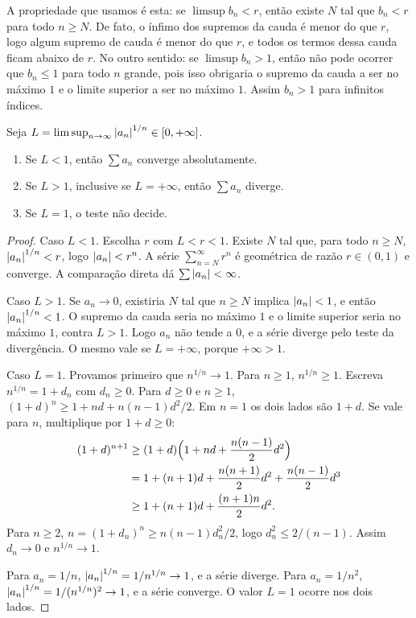 \documentclass[11pt,a4paper]{article}
\begin{document}
A propriedade que usamos é esta: se \(\limsup b_n<r\), então existe \(N\) tal que \(b_n<r\) para todo \(n\ge N\). De fato, o ínfimo dos supremos da cauda é menor do que \(r\), logo algum supremo de cauda é menor do que \(r\), e todos os termos dessa cauda ficam abaixo de \(r\). No outro sentido: se \(\limsup b_n>1\), então não pode ocorrer que \(b_n\le 1\) para todo \(n\) grande, pois isso obrigaria o supremo da cauda a ser no máximo \(1\) e o limite superior a ser no máximo \(1\). Assim \(b_n>1\) para infinitos índices.

\begin{teorema}
Seja \(L=\limsup_{n\to\infty}\left\lvert a_n \right\rvert^{1/n}\in[0,+\infty]\).
\begin{enumerate}
\item Se \(L<1\), então \(\sum a_n\) converge absolutamente.
\item Se \(L>1\), inclusive se \(L=+\infty\), então \(\sum a_n\) diverge.
\item Se \(L=1\), o teste não decide.
\end{enumerate}
\end{teorema}

\begin{proof}
Caso \(L<1\). Escolha \(r\) com \(L<r<1\). Existe \(N\) tal que, para todo \(n\ge N\), \(\left\lvert a_n \right\rvert^{1/n}<r\), logo \(\left\lvert a_n \right\rvert<r^n\). A série \(\sum_{n=N}^\infty r^n\) é geométrica de razão \(r\in(0,1)\) e converge. A comparação direta dá \(\sum\left\lvert a_n \right\rvert<\infty\).

Caso \(L>1\). Se \(a_n\to 0\), existiria \(N\) tal que \(n\ge N\) implica \(\left\lvert a_n \right\rvert<1\), e então \(\left\lvert a_n \right\rvert^{1/n}<1\). O supremo da cauda seria no máximo \(1\) e o limite superior seria no máximo \(1\), contra \(L>1\). Logo \(a_n\) não tende a \(0\), e a série diverge pelo teste da divergência. O mesmo vale se \(L=+\infty\), porque \(+\infty>1\).

Caso \(L=1\). Provamos primeiro que \(n^{1/n}\to 1\). Para \(n\ge 1\), \(n^{1/n}\ge 1\). Escreva \(n^{1/n}=1+d_n\) com \(d_n\ge 0\). Para \(d\ge 0\) e \(n\ge 1\), \((1+d)^n\ge 1+nd+n(n-1)d^2/2\). Em \(n=1\) os dois lados são \(1+d\). Se vale para \(n\), multiplique por \(1+d\ge 0\):
\begin{align*}
(1+d)^{n+1}
&\ge(1+d)\Bigl(1+nd+\frac{n(n-1)}{2}d^2\Bigr)\\
&=1+(n+1)d+\frac{n(n+1)}{2}d^2+\frac{n(n-1)}{2}d^3\\
&\ge 1+(n+1)d+\frac{(n+1)n}{2}d^2.
\end{align*}
Para \(n\ge 2\), \(n=(1+d_n)^n\ge n(n-1)d_n^2/2\), logo \(d_n^2\le 2/(n-1)\). Assim \(d_n\to 0\) e \(n^{1/n}\to 1\).

Para \(a_n=1/n\), \(\left\lvert a_n \right\rvert^{1/n}=1/n^{1/n}\to 1\), e a série diverge. Para \(a_n=1/n^2\), \(\left\lvert a_n \right\rvert^{1/n}=1/(n^{1/n})^2\to 1\), e a série converge. O valor \(L=1\) ocorre nos dois lados.
\end{proof}
\end{document}
